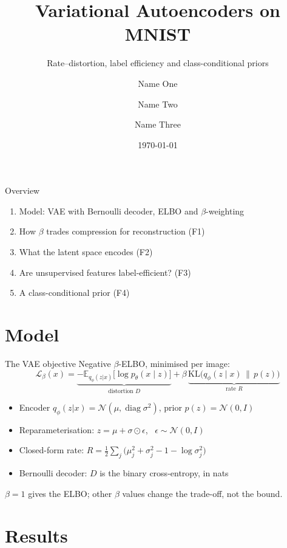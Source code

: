 \documentclass[aspectratio=169,11pt]{beamer}
\title{Variational Autoencoders on MNIST}
\subtitle{Rate--distortion, label efficiency and class-conditional priors}
\author{Name One \and Name Two \and Name Three}
\institute{Course name, Institution}
\date{\today}
\newcommand{\takeaway}[1]{\vfill\begin{center}\colorbox{accent!10}{\parbox{0.92\linewidth}{\centering #1}}\end{center}}
\newcommand{\KL}{\mathrm{KL}}
\newcommand{\E}{\mathbb{E}}
\begin{document}
\begin{frame}[plain]
  \titlepage
\end{frame}

\begin{frame}{Overview}
  \begin{enumerate}
    \item Model: VAE with Bernoulli decoder, ELBO and $\beta$-weighting
    \item How $\beta$ trades compression for reconstruction (F1)
    \item What the latent space encodes (F2)
    \item Are unsupervised features label-efficient? (F3)
    \item A class-conditional prior (F4)
  \end{enumerate}
\end{frame}

\section{Model}

\begin{frame}{The VAE objective}
  Negative $\beta$-ELBO, minimised per image:
  \[
    \mathcal{L}_\beta(x) =
    \underbrace{-\E_{q_\phi(z|x)}\big[\log p_\theta(x\mid z)\big]}_{\text{distortion } D}
    + \beta\,
    \underbrace{\KL\big(q_\phi(z\mid x)\,\|\,p(z)\big)}_{\text{rate } R}
  \]
  \begin{itemize}
    \item Encoder $q_\phi(z|x) = \mathcal{N}(\mu, \operatorname{diag}\sigma^2)$, prior $p(z)=\mathcal{N}(0, I)$
    \item Reparameterisation: $z = \mu + \sigma\odot\epsilon$, \ $\epsilon\sim\mathcal{N}(0,I)$
    \item Closed-form rate:
      $R = \tfrac12\sum_j\big(\mu_j^2 + \sigma_j^2 - 1 - \log\sigma_j^2\big)$
    \item Bernoulli decoder: $D$ is the binary cross-entropy, in nats
  \end{itemize}
  \takeaway{$\beta = 1$ gives the ELBO; other $\beta$ values change the trade-off, not the bound.}
\end{frame}

\section{Results}
\end{document}
